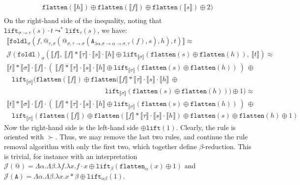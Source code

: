 \documentclass[a4paper,UKenglish,cleveref,autoref,numberwithinsect]{lipics-v2019}
\theoremstyle{definition}
\newcommand{\arrtype}{\rightarrow}
\newcommand{\abs}[2]{\lambda #1.#2}
\newcommand{\arrW}{\leadsto}
\newcommand{\flatten}{\mathtt{flatten}}
\newcommand{\lift}{\mathtt{lift}}
\newcommand{\typeinterpret}[1]{\llbracket #1 \rrbracket}
\newcommand{\interpret}[1]{\llbracket #1 \rrbracket}
\newcommand{\Termmap}{\mathcal{J}}
\begin{document}
\begin{example}
{\[\begin{array}{l}
\flatten(\interpret{h}) \oplus
\flatten(\interpret{f}) \oplus\flatten(\interpret{s}) \oplus 2) \\
\end{array}
\]
On the right-hand side of the inequality, noting that
$\lift_{\sigma \arrtype \tau}(s) \cdot t \arrW^*
\lift_{\tau}(s)$, we have:
\[
\begin{array}{l}
\interpret{\mathtt{foldl}_\sigma(f,@_{\tau,\sigma}(@_{\sigma,\tau
    \arrtype\sigma}(
      \mathtt{A}_{\abs{\alpha}{\sigma\arrtype\alpha\arrtype\sigma},
      \tau}(f),s),h),t)} \approx \\
\Termmap(\mathtt{foldl})_\sigma(\interpret{f},\ 
  \interpret{f} * \typeinterpret{\tau} \cdot \interpret{s} \cdot
  \interpret{h} \oplus \lift_{\typeinterpret{\sigma}}(\flatten(s)
  \oplus \flatten(h)),\ \interpret{t}) \approx \\
\interpret{t} * \typeinterpret{\sigma} \cdot \interpret{f} \cdot
  (\ \interpret{f} * \typeinterpret{\tau} \cdot \interpret{s} \cdot
  \interpret{h} \oplus \lift_{\typeinterpret{\sigma}}(\flatten(s)
  \oplus \flatten(h))\ )\ \oplus \\
\phantom{A}
  \lift_{\typeinterpret{\sigma}}(\flatten(\interpret{f}) \oplus
  \flatten(\interpret{f} * \typeinterpret{\tau} \cdot \interpret{s} \cdot
  \interpret{h}\ \oplus \\
  \phantom{ABCDEFGHIJKLMNOPQRSt}
  \lift_{\typeinterpret{\sigma}}(\flatten(s)
  \oplus \flatten(h))) \oplus 1) \approx \\
\interpret{t} * \typeinterpret{\sigma} \cdot \interpret{f} \cdot
  (\ \interpret{f} * \typeinterpret{\tau} \cdot \interpret{s} \cdot
  \interpret{h} \oplus \lift_{\typeinterpret{\sigma}}(\flatten(s)
  \oplus \flatten(h))\ )\ \oplus \\
\phantom{A}
  \lift_{\typeinterpret{\sigma}}(\flatten(\interpret{f}) \oplus
  \flatten(\interpret{f} * \typeinterpret{\tau} \cdot \interpret{s} \cdot
  \interpret{h}) \oplus \flatten(s) \oplus \flatten(h) \oplus 1)
\end{array}
\]
Now the right-hand side is the left-hand side $\oplus \lift(1)$.
Clearly, the rule is oriented with $\succ$.  Thus, we may remove the
last two rules, and continue the rule removal algorithm with only the
first two, which together define $\beta$-reduction.  This is trivial,
for instance with an interpretation
$\Termmap(@) = \Lambda \alpha.\Lambda \beta.\lambda f.\lambda x.
f \cdot x \oplus \lift_\beta(\flatten_\alpha(x) \oplus 1)$ and
$\Termmap(\mathtt{A}) = \Lambda \alpha.\Lambda \beta.\lambda x.
x * \beta \oplus \lift_{\alpha\beta}(1)$.
}

\end{example}
\end{document}

